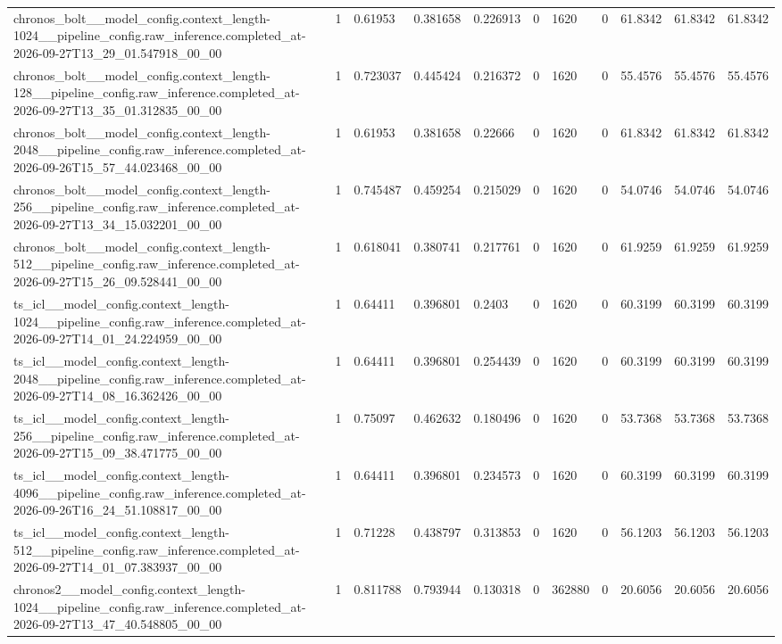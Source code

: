 \begin{tabular}{lllllllllll}
chronos\_bolt\_\_model\_config.context\_length-1024\_\_pipeline\_config.raw\_inference.completed\_at-2026-09-27T13\_29\_01.547918\_00\_00 & 1 & 0.61953 & 0.381658 & 0.226913 & 0 & 1620 & 0 & 61.8342 & 61.8342 & 61.8342 \\
chronos\_bolt\_\_model\_config.context\_length-128\_\_pipeline\_config.raw\_inference.completed\_at-2026-09-27T13\_35\_01.312835\_00\_00 & 1 & 0.723037 & 0.445424 & 0.216372 & 0 & 1620 & 0 & 55.4576 & 55.4576 & 55.4576 \\
chronos\_bolt\_\_model\_config.context\_length-2048\_\_pipeline\_config.raw\_inference.completed\_at-2026-09-26T15\_57\_44.023468\_00\_00 & 1 & 0.61953 & 0.381658 & 0.22666 & 0 & 1620 & 0 & 61.8342 & 61.8342 & 61.8342 \\
chronos\_bolt\_\_model\_config.context\_length-256\_\_pipeline\_config.raw\_inference.completed\_at-2026-09-27T13\_34\_15.032201\_00\_00 & 1 & 0.745487 & 0.459254 & 0.215029 & 0 & 1620 & 0 & 54.0746 & 54.0746 & 54.0746 \\
chronos\_bolt\_\_model\_config.context\_length-512\_\_pipeline\_config.raw\_inference.completed\_at-2026-09-27T15\_26\_09.528441\_00\_00 & 1 & 0.618041 & 0.380741 & 0.217761 & 0 & 1620 & 0 & 61.9259 & 61.9259 & 61.9259 \\
ts\_icl\_\_model\_config.context\_length-1024\_\_pipeline\_config.raw\_inference.completed\_at-2026-09-27T14\_01\_24.224959\_00\_00 & 1 & 0.64411 & 0.396801 & 0.2403 & 0 & 1620 & 0 & 60.3199 & 60.3199 & 60.3199 \\
ts\_icl\_\_model\_config.context\_length-2048\_\_pipeline\_config.raw\_inference.completed\_at-2026-09-27T14\_08\_16.362426\_00\_00 & 1 & 0.64411 & 0.396801 & 0.254439 & 0 & 1620 & 0 & 60.3199 & 60.3199 & 60.3199 \\
ts\_icl\_\_model\_config.context\_length-256\_\_pipeline\_config.raw\_inference.completed\_at-2026-09-27T15\_09\_38.471775\_00\_00 & 1 & 0.75097 & 0.462632 & 0.180496 & 0 & 1620 & 0 & 53.7368 & 53.7368 & 53.7368 \\
ts\_icl\_\_model\_config.context\_length-4096\_\_pipeline\_config.raw\_inference.completed\_at-2026-09-26T16\_24\_51.108817\_00\_00 & 1 & 0.64411 & 0.396801 & 0.234573 & 0 & 1620 & 0 & 60.3199 & 60.3199 & 60.3199 \\
ts\_icl\_\_model\_config.context\_length-512\_\_pipeline\_config.raw\_inference.completed\_at-2026-09-27T14\_01\_07.383937\_00\_00 & 1 & 0.71228 & 0.438797 & 0.313853 & 0 & 1620 & 0 & 56.1203 & 56.1203 & 56.1203 \\
chronos2\_\_model\_config.context\_length-1024\_\_pipeline\_config.raw\_inference.completed\_at-2026-09-27T13\_47\_40.548805\_00\_00 & 1 & 0.811788 & 0.793944 & 0.130318 & 0 & 362880 & 0 & 20.6056 & 20.6056 & 20.6056 \\

\end{tabular}
